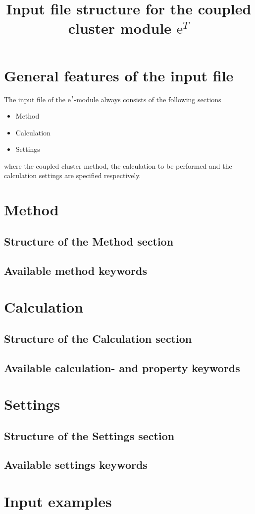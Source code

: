\documentclass[a4paper]{amsart}
\begin{document}
\title{Input file structure for the coupled cluster module $\text{e}^T$}
\author{}
\date{}
\maketitle
\section*{General features of the input file}
The input file of the $\text{e}^T$-module always consists of the following sections
\begin{itemize}
	\item Method
	\item Calculation
	\item Settings
\end{itemize}
where the coupled cluster method, the calculation to be performed and the calculation settings are specified respectively.
\section{Method}
\subsection{Structure of the Method section}
\subsection{Available method keywords}
\section{Calculation}
\subsection{Structure of the Calculation section}
\subsection{Available calculation- and property keywords}
\section{Settings}
\subsection{Structure of the Settings section}
\subsection{Available settings keywords}
\section{Input examples}
\end{document}
